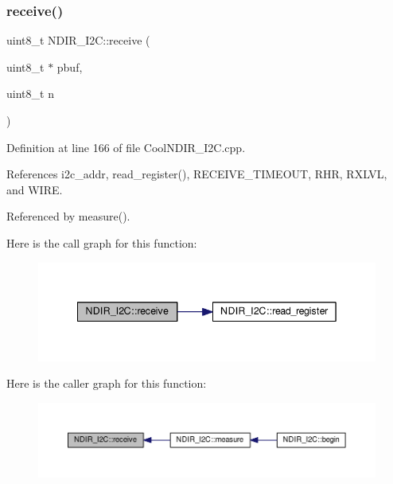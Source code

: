 \subsubsection{\texorpdfstring{receive()}{receive()}}
{\footnotesize\ttfamily uint8\+\_\+t N\+D\+I\+R\+\_\+\+I2\+C\+::receive (\begin{DoxyParamCaption}\item[{uint8\+\_\+t $\ast$}]{pbuf,  }\item[{uint8\+\_\+t}]{n }\end{DoxyParamCaption})\hspace{0.3cm}{\ttfamily [private]}}



Definition at line 166 of file Cool\+N\+D\+I\+R\+\_\+\+I2\+C.\+cpp.



References i2c\+\_\+addr, read\+\_\+register(), R\+E\+C\+E\+I\+V\+E\+\_\+\+T\+I\+M\+E\+O\+UT, R\+HR, R\+X\+L\+VL, and W\+I\+RE.



Referenced by measure().

Here is the call graph for this function\+:
\nopagebreak
\begin{figure}[H]
\begin{center}
\leavevmode
\includegraphics[width=342pt]{d6/ddb/class_n_d_i_r___i2_c_aa6d2b8dd287f9c9015461cebb18f9abc_cgraph}
\end{center}
\end{figure}
Here is the caller graph for this function\+:
\nopagebreak
\begin{figure}[H]
\begin{center}
\leavevmode
\includegraphics[width=350pt]{d6/ddb/class_n_d_i_r___i2_c_aa6d2b8dd287f9c9015461cebb18f9abc_icgraph}
\end{center}
\end{figure}
\mbox{\label{class_n_d_i_r___i2_c_aa72058e6e7c6174b14466fee4b2df1e0}} 

